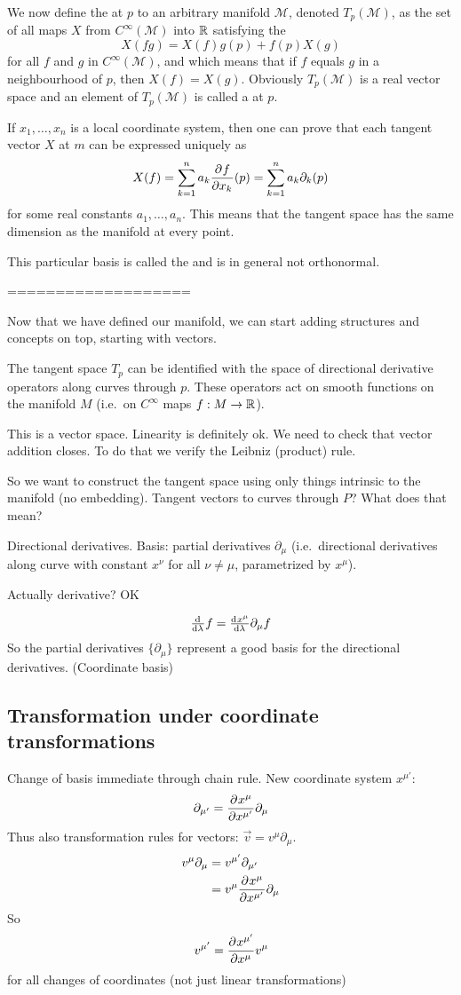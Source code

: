 We now define the  at $p$ to an arbitrary manifold $\mathcal{M}$, denoted $T_p(\mathcal{M})$, as the set of all  maps $X$ from $C^\infty(\mathcal{M})$ into $\mathbb{R}$ satisfying the 
\[X(fg) = X(f)g(p) + f(p)X(g)\]
for all $f$ and $g$ in $C^\infty(\mathcal{M})$, and  which means that if $f$ equals $g$ in a neighbourhood of $p$, then $X(f) = X(g)$. Obviously $T_p(\mathcal{M})$ is a real vector space and an element of $T_p(\mathcal{M})$ is called a  at $p$.

If $x_1,\ldots, x_n$ is a local coordinate system, then one can prove that each tangent vector $X$ at $m$ can be expressed uniquely as
\[ X(f) = \sum^n_{k=1}a_k  \frac{\partial{^{}}f}{\partial{{x_k}^{}}} (p) = \sum^n_{k=1}a_k\partial_k(p) \]
for some real constants $a_1, \ldots, a_n$. This means that the tangent space has the same dimension as the manifold at every point.

This particular basis is called the  and is in general not orthonormal.

===================

Now that we have defined our manifold, we can start adding structures and concepts on top, starting with vectors.

The tangent space $T_p$ can be identified with the space of directional derivative operators along curves through $p$. These operators act on smooth functions on the manifold $M$ (i.e.\ on $C^\infty$ maps $f: M \to \mathbb{R}$).

This is a vector space. Linearity is definitely ok. We need to check that vector addition closes. To do that we verify the Leibniz (product) rule.

So we want to construct the tangent space using only things intrinsic to the manifold (no embedding). Tangent vectors to curves through $P$? What does that mean?

Directional derivatives. Basis: partial derivatives $\partial_\mu$ (i.e.\ directional derivatives along curve with constant $x^\nu$ for all $\nu\neq\mu$, parametrized by $x^\mu$).

Actually derivative? OK

\[\od{}{\lambda}f = \od{x^\mu}{\lambda}\partial_{\mu}f\]
So the partial derivatives $\{ \partial_\mu \}$ represent a good basis for the directional derivatives. (Coordinate basis)

\subsection{Transformation under coordinate transformations}
Change of basis immediate through chain rule. New coordinate system $x^{\mu'}$:
\[ \partial_{\mu'} =  \frac{\partial{^{}}x^\mu}{\partial{{x^{\mu'}}^{}}} \partial_\mu \]
Thus also transformation rules for vectors: $\vec{v} = v^\mu\partial_\mu$.
\begin{align}
v^\mu \partial_\mu &= v^{\mu'}\partial_{\mu'} \\
& = v^{\mu} \frac{\partial{^{}}x^\mu}{\partial{{x^{\mu'}}^{}}} \partial_\mu
\end{align}
So
\[ v^{\mu'} =  \frac{\partial{^{}}x^{\mu'}}{\partial{{x^\mu}^{}}} v^\mu \]
for all changes of coordinates (not just linear transformations)

